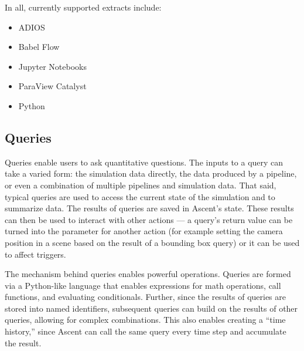 In all, currently supported extracts include:
\begin{itemize}
\item ADIOS
\item Babel Flow~\cite{babelflow}
\item Jupyter Notebooks
\item ParaView Catalyst
\item Python
\end{itemize}

\subsection{Queries}
\label{action_queries}
Queries enable users to ask quantitative questions.
%
The inputs to a query can take a varied form:
the simulation data directly,
the data produced by a pipeline,
or even a combination of multiple pipelines and simulation data.
%
That said, typical queries are used to access the current state of the simulation
and to summarize data.
%
The results of queries are saved in Ascent's state.
%
These results can then be used to
interact with other actions --- a query's return value can be turned
into the parameter for another action (for example setting the camera position in a scene based
on the result of a bounding box query) or it can be used to affect triggers.
%

The mechanism behind queries enables powerful operations.
%
Queries are formed via a Python-like language that
enables expressions for math operations,
call functions, and evaluating conditionals.
%
Further, since the results of queries are stored into named identifiers, subsequent queries
can build on the results of other queries, allowing for complex combinations.
%
%
This also enables creating a ``time history,'' since
Ascent can call the same query every time step and accumulate the result.


%
%

